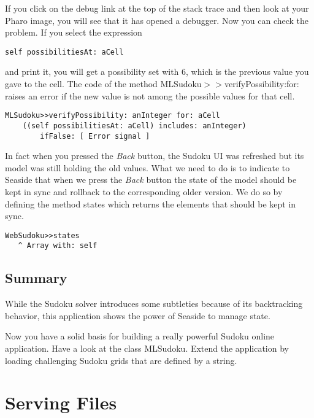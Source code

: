 \documentclass[a4paper,10pt,twoside]{book}
\newcommand{\ct}[1]{{\small\ttfamily\textup{#1}}}
\begin{document}
If you click on the debug link at the top of the stack trace and then look at your Pharo image, you will see that it has opened a debugger. Now you can check the problem. If you select the expression

\begin{lstlisting}
self possibilitiesAt: aCell
\end{lstlisting}

and print it, you will get a possibility set with 6, which is the previous value you gave to the cell. The code of the method \ct{MLSudoku$>$$>$verifyPossibility:for:} raises an error if the new value is not among the possible values for that cell.

\begin{lstlisting}
MLSudoku>>verifyPossibility: anInteger for: aCell
    ((self possibilitiesAt: aCell) includes: anInteger)
        ifFalse: [ Error signal ]
\end{lstlisting}

In fact when you pressed the \textit{Back} button, the Sudoku UI was refreshed but its model was still holding the old values. What we need to do is to indicate to Seaside that when we press the \textit{Back} button the state of the model should be kept in sync and rollback to the corresponding older version. We do so by defining the method  \ct{states} which returns the elements that should be kept in sync.

\begin{lstlisting}
WebSudoku>>states
   ^ Array with: self
\end{lstlisting}

\section{Summary}
\label{book:inaction:sudoku:summary}

While the Sudoku solver introduces some subtleties because of its backtracking behavior, this application shows the power of Seaside to manage state. 

Now you have a solid basis for building a really powerful Sudoku online application. Have a look at the class \ct{MLSudoku}. Extend the application by loading challenging Sudoku grids that are defined by a string.

\chapter{Serving Files}
\label{book:inaction:servingfiles}
\end{document}
